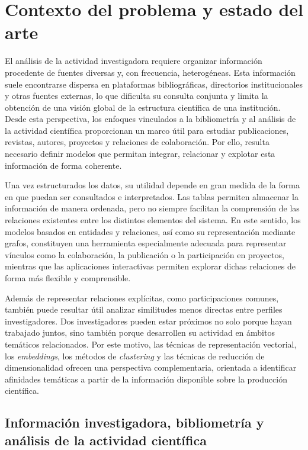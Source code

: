 \documentclass[11pt,spanish,listoffigures,listoftables]{tfgetsinf}
\begin{document}

\chapter{Contexto del problema y estado del arte}

El análisis de la actividad investigadora requiere organizar información procedente de fuentes diversas y, con frecuencia, heterogéneas. Esta información suele encontrarse dispersa en plataformas bibliográficas, directorios institucionales y otras fuentes externas, lo que dificulta su consulta conjunta y limita la obtención de una visión global de la estructura científica de una institución. Desde esta perspectiva, los enfoques vinculados a la bibliometría y al análisis de la actividad científica proporcionan un marco útil para estudiar publicaciones, revistas, autores, proyectos y relaciones de colaboración. Por ello, resulta necesario definir modelos que permitan integrar, relacionar y explotar esta información de forma coherente.

Una vez estructurados los datos, su utilidad depende en gran medida de la forma en que puedan ser consultados e interpretados. Las tablas permiten almacenar la información de manera ordenada, pero no siempre facilitan la comprensión de las relaciones existentes entre los distintos elementos del sistema. En este sentido, los modelos basados en entidades y relaciones, así como su representación mediante grafos, constituyen una herramienta especialmente adecuada para representar vínculos como la colaboración, la publicación o la participación en proyectos, mientras que las aplicaciones interactivas permiten explorar dichas relaciones de forma más flexible y comprensible.

Además de representar relaciones explícitas, como participaciones comunes, también puede resultar útil analizar similitudes menos directas entre perfiles investigadores. Dos
investigadores pueden estar próximos no solo porque hayan trabajado juntos, sino también porque desarrollen su actividad en ámbitos temáticos relacionados. Por este motivo, las técnicas de representación vectorial, los \textit{embeddings}, los métodos de \textit{clustering} y las técnicas de reducción de dimensionalidad ofrecen una perspectiva complementaria, orientada a identificar afinidades temáticas a partir de la información disponible sobre la producción científica.

\section{Información investigadora, bibliometría y análisis de la actividad científica}
\end{document}
